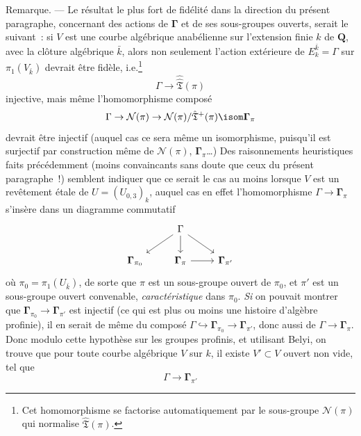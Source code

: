Remarque. --- Le résultat le plus fort de fidélité dans la direction du présent paragraphe, concernant des actions de $\boldsymbol{\Gamma}$ et de ses sous-groupes ouverts, serait le suivant~: si $V$ est une courbe algébrique anabélienne sur l'extension finie $k$ de ${\mathbf{Q}}$, avec la clôture algébrique $\bar k$, alors non seulement l'action extérieure de $E^{\bar k}_k=\Gamma$ sur $\pi_1(V_{\bar k})$ devrait être fidèle, i.e.\footnote{Cet homomorphisme se factorise automatiquement par le sous-groupe $\mathcal{N}(\pi)$ qui normalise $\hat{\mathfrak{T}}(\pi)$.}
$$
\Gamma\to\hat{\hat{\mathfrak{T}}}(\pi)
$$
injective, mais même l'homomorphisme composé
$$
\Gamma\to\mathcal{N}(\pi)\to\mathcal{N}(\pi)/\hat{\mathfrak{T}}^+(\pi) \isom \boldsymbol{\Gamma}_\pi
$$
devrait être injectif (auquel cas ce sera même un isomorphisme, puisqu'il est surjectif par construction même de $\mathcal{N}(\pi)$, $\boldsymbol{\Gamma}_\pi$\dots) Des raisonnements heuristiques faits précédemment (moins convaincants sans doute que ceux du présent paragraphe~!) semblent indiquer que ce serait le cas au moins lorsque $V$ est un revêtement étale de $U=(U_{0,3})_k$, auquel cas en effet l'homomorphisme $\Gamma\to\boldsymbol{\Gamma}_\pi$ s'insère dans un diagramme commutatif
\[\begin{tikzcd}
	& \Gamma \\
	{\boldsymbol{\Gamma}_{\pi_0}} & {\boldsymbol{\Gamma}_\pi} & {\boldsymbol{\Gamma}_{\pi'}}
	\arrow[from=1-2, to=2-2]
	\arrow[from=2-2, to=2-3]
	\arrow[from=1-2, to=2-3]
	\arrow[from=1-2, to=2-1]
\end{tikzcd}\]
où $\pi_0=\pi_1(U_{\bar k})$, de sorte que $\pi$ est un sous-groupe ouvert de $\pi_0$, et $\pi'$ est un sous-groupe ouvert convenable, \emph{caractéristique} dans $\pi_0$. \emph{Si} on pouvait montrer que $\boldsymbol{\Gamma}_{\pi_0}\to\boldsymbol{\Gamma}_{\pi'}$ est injectif (ce qui est plus ou moins une histoire d'algèbre profinie), il en serait de même du composé $\Gamma\hookrightarrow\boldsymbol{\Gamma}_{\pi_0}\to\boldsymbol{\Gamma}_{\pi'}$, donc aussi de $\Gamma\to\boldsymbol{\Gamma}_{\pi}$. Donc modulo cette hypothèse sur les groupes profinis, et utilisant Belyi, on trouve que pour toute courbe algébrique $V$ sur $k$, il existe $V'\subset  V$ ouvert non vide, tel que
$$
\Gamma\to\boldsymbol{\Gamma}_{\pi'}
$$
